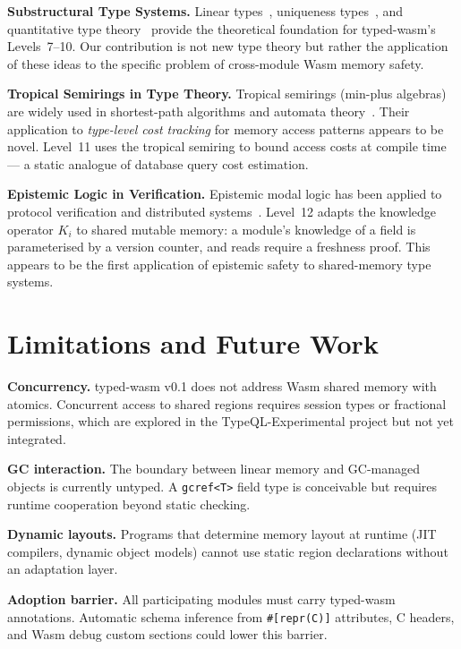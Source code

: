 \documentclass[sigplan,nonacm,screen]{acmart}
\begin{document}
\textbf{Substructural Type Systems.}
Linear types~\cite{wadler1990}, uniqueness types~\cite{barendsen1996}, and
quantitative type theory~\cite{atkey2018} provide the theoretical
foundation for typed-wasm's Levels~7--10. Our contribution is not new type
theory but rather the application of these ideas to the specific problem
of cross-module Wasm memory safety.

\textbf{Tropical Semirings in Type Theory.}
Tropical semirings (min-plus algebras) are widely used in shortest-path
algorithms and automata theory~\cite{simon1988}. Their application to
\emph{type-level cost tracking} for memory access patterns appears to be
novel. Level~11 uses the tropical semiring to bound access costs at
compile time --- a static analogue of database query cost estimation.

\textbf{Epistemic Logic in Verification.}
Epistemic modal logic has been applied to protocol verification and
distributed systems~\cite{fagin1995}. Level~12 adapts the knowledge
operator $K_i$ to shared mutable memory: a module's knowledge of a field
is parameterised by a version counter, and reads require a freshness
proof. This appears to be the first application of epistemic safety to
shared-memory type systems.

\section{Limitations and Future Work}
\label{sec:limitations}

\textbf{Concurrency.}
typed-wasm v0.1 does not address Wasm shared memory with atomics.
Concurrent access to shared regions requires session types or fractional
permissions, which are explored in the TypeQL-Experimental project but not
yet integrated.

\textbf{GC interaction.}
The boundary between linear memory and GC-managed objects is currently
untyped. A \texttt{gcref<T>} field type is conceivable but requires
runtime cooperation beyond static checking.

\textbf{Dynamic layouts.}
Programs that determine memory layout at runtime (JIT compilers, dynamic
object models) cannot use static region declarations without an adaptation
layer.

\textbf{Adoption barrier.}
All participating modules must carry typed-wasm annotations. Automatic
schema inference from \texttt{\#[repr(C)]} attributes, C headers, and Wasm
debug custom sections could lower this barrier.
\end{document}
